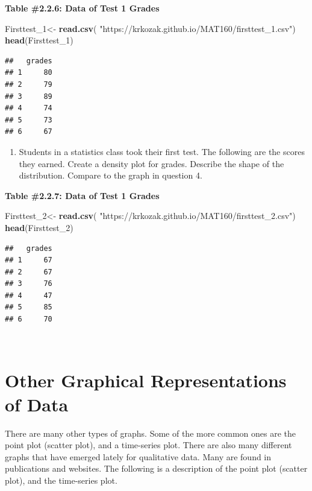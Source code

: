 \documentclass[
]{book}
\newenvironment{Shaded}{\begin{snugshade}}{\end{snugshade}}
\newcommand{\DecValTok}[1]{\textcolor[rgb]{0.00,0.00,0.81}{#1}}
\newcommand{\KeywordTok}[1]{\textcolor[rgb]{0.13,0.29,0.53}{\textbf{#1}}}
\newcommand{\NormalTok}[1]{#1}
\newcommand{\StringTok}[1]{\textcolor[rgb]{0.31,0.60,0.02}{#1}}
\providecommand{\tightlist}{%
  \setlength{\itemsep}{0pt}\setlength{\parskip}{0pt}}
\begin{document}
\textbf{Table \#2.2.6: Data of Test 1 Grades}

\begin{Shaded}
\begin{Highlighting}[]
\NormalTok{Firsttest_}\DecValTok{1}\NormalTok{<-}\StringTok{ }\KeywordTok{read.csv}\NormalTok{(}
  \StringTok{"https://krkozak.github.io/MAT160/firsttest_1.csv"}\NormalTok{)}
\KeywordTok{head}\NormalTok{(Firsttest_}\DecValTok{1}\NormalTok{)}
\end{Highlighting}
\end{Shaded}

\begin{verbatim}
##   grades
## 1     80
## 2     79
## 3     89
## 4     74
## 5     73
## 6     67
\end{verbatim}

\begin{enumerate}
\def\labelenumi{\arabic{enumi}.}
\setcounter{enumi}{4}
\tightlist
\item
  Students in a statistics class took their first test. The following are the scores they earned. Create a density plot for grades. Describe the shape of the distribution. Compare to the graph in question 4.
\end{enumerate}

\textbf{Table \#2.2.7: Data of Test 1 Grades}

\begin{Shaded}
\begin{Highlighting}[]
\NormalTok{Firsttest_}\DecValTok{2}\NormalTok{<-}\StringTok{ }\KeywordTok{read.csv}\NormalTok{(}
  \StringTok{"https://krkozak.github.io/MAT160/firsttest_2.csv"}\NormalTok{)}
\KeywordTok{head}\NormalTok{(Firsttest_}\DecValTok{2}\NormalTok{)}
\end{Highlighting}
\end{Shaded}

\begin{verbatim}
##   grades
## 1     67
## 2     67
## 3     76
## 4     47
## 5     85
## 6     70
\end{verbatim}

\emph{\\
}

\hypertarget{other-graphical-representations-of-data}{%
\section{Other Graphical Representations of Data}\label{other-graphical-representations-of-data}}

There are many other types of graphs. Some of the more common ones are the point plot (scatter plot), and a time-series plot. There are also many different graphs that have emerged lately for qualitative data. Many are found in publications and websites. The following is a description of the point plot (scatter plot), and the time-series plot.
\end{document}
